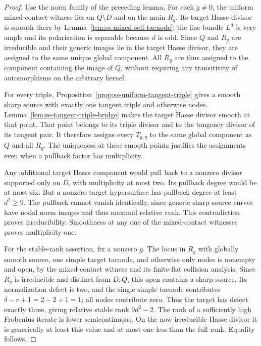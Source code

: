 \begin{proof}
Use the norm family of the preceding lemma. For each $g\ne0$,
the uniform mixed-contact witness lies on $Q\setminus D$ and
on the main $R_g$. Its target Hasse divisor is smooth there by
Lemma~\ref{lem:ss-mixed-self-tacnode}; the line bundle $L^d$ is
very ample and its polarization is separable because $d$ is odd.
Since $Q$ and $R_g$ are irreducible and their generic images lie
in the target Hasse divisor, they are assigned to the same unique
global component. All $R_g$ are thus assigned to the component
containing the image of $Q$, without requiring any transitivity
of automorphisms on the arbitrary kernel.

For every triple, Proposition~\ref{prop:ss-uniform-tangent-triple}
gives a smooth sharp source with exactly one tangent triple and
otherwise nodes. Lemma~\ref{lem:ss-tangent-triple-bridge} makes
the target Hasse divisor smooth at that point. That point belongs
to its triple divisor and to the tangency divisor of its tangent
pair. It therefore assigns every $T_{g,\eta}$ to the same global
component as $Q$ and all $R_g$. The uniqueness at these smooth
points justifies the assignments even when a pullback factor has
multiplicity.

Any additional target Hasse component would pull back to a
nonzero divisor supported only on $D$, with multiplicity at most
two. Its pullback degree would be at most six. But a nonzero
target hypersurface has pullback degree at least $d^2\ge9$.
The pullback cannot vanish identically, since generic sharp source
curves have nodal norm images and thus maximal relative rank.
This contradiction proves irreducibility. Smoothness at any one
of the mixed-contact witnesses proves multiplicity one.

For the stable-rank assertion, fix a nonzero $g$.
The locus in $R_g$ with globally smooth source, one simple target
tacnode, and otherwise only nodes is nonempty and open, by the
mixed-contact witness and its finite-flat collision analysis.
Since $R_g$ is irreducible and distinct from $D,Q$, this open
contains a sharp source. Its normalization defect is two, and
the single simple tacnode contributes
$\delta-r+1=2-2+1=1$; all nodes contribute zero.
Thus the target has defect exactly three, giving relative stable
rank $9d^2-2$. The rank of a sufficiently high Frobenius iterate
is lower semicontinuous. On the now irreducible Hasse divisor it
is generically at least this value and at most one less than the
full rank. Equality follows.
\end{proof}

